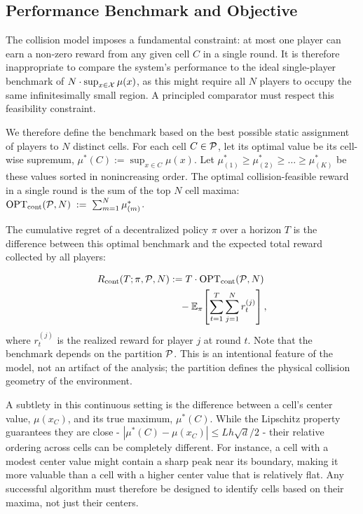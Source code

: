 \subsection{Performance Benchmark and Objective}

The collision model imposes a fundamental constraint: at most one player can earn a non-zero reward from any given cell $C$ in a single round. It is therefore inappropriate to compare the system's performance to the ideal single-player benchmark of $N \cdot \sup_{x \in \mathcal{X}} \mu(x)$, as this might require all $N$ players to occupy the same infinitesimally small region. A principled comparator must respect this feasibility constraint.

We therefore define the benchmark based on the best possible static assignment of players to $N$ distinct cells. For each cell $C \in \mathcal{P}$, let its optimal value be its cell-wise supremum, $\mu^\ast(C) := \sup_{x\in C}\mu(x)$. Let $\mu^\ast_{(1)}\ge \mu^\ast_{(2)}\ge\dots\ge \mu^\ast_{(K)}$ be these values sorted in nonincreasing order. The optimal collision-feasible reward in a single round is the sum of the top $N$ cell maxima: $\mathrm{OPT}_{\mathrm{cont}}(\mathcal{P},N) \;:=\; \sum_{m=1}^N \mu^\ast_{(m)}$.

The cumulative regret of a decentralized policy $\pi$ over a horizon $T$ is the difference between this optimal benchmark and the expected total reward collected by all players:

\begin{equation}
\label{eq:cont-regret}
\begin{aligned}
R_{\mathrm{cont}}(T; \pi, \mathcal{P}, N) &:= T \cdot \mathrm{OPT}_{\mathrm{cont}}(\mathcal{P}, N) \\
&\quad - \mathbb{E}_\pi \! \left[ \sum_{t=1}^T \sum_{j=1}^N r_t^{(j)} \right],
\end{aligned}
\end{equation}
where $r_t^{(j)}$ is the realized reward for player $j$ at round $t$. Note that the benchmark depends on the partition $\mathcal{P}$. This is an intentional feature of the model, not an artifact of the analysis; the partition defines the physical collision geometry of the environment.


A subtlety in this continuous setting is the difference between a cell's center value, $\mu(x_C)$, and its true maximum, $\mu^\ast(C)$. While the Lipschitz property guarantees they are close - $|\mu^\ast(C) - \mu(x_C)| \le Lh\sqrt{d}/2$ - their relative ordering across cells can be completely different. For instance, a cell with a modest center value might contain a sharp peak near its boundary, making it more valuable than a cell with a higher center value that is relatively flat. Any successful algorithm must therefore be designed to identify cells based on their maxima, not just their centers.

